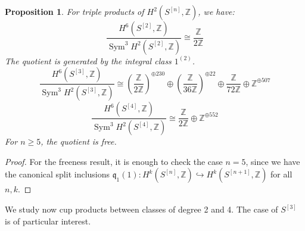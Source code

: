 \documentclass{amsart}
\DeclareMathOperator{\Sym}{Sym}
\newcommand{\hilb}[1]{^{[#1]}}
\newcommand{\One}{1}
\newcommand{\IZ}{\mathbb{Z}}
\newcommand{\kq}{\mathfrak{q}}
\theoremstyle{plain}
\newtheorem{proposition}[theorem]{Proposition}
\theoremstyle{definition}
\theoremstyle{remark}
\begin{document}
\begin{proposition} For triple products of $H^2(S\hilb{n},\IZ)$, we have:
$$
\frac{H^6(S\hilb{2},\IZ)}{\Sym^3 H^2(S\hilb{2},\IZ)} \cong 
\frac{\IZ}{2\IZ}
$$
The quotient is generated by the integral class $\One^{(2)}$.
$$
\frac{H^6(S\hilb{3},\IZ)}{\Sym^3 H^2(S\hilb{3},\IZ)} \cong  \left(\frac{\IZ}{2\IZ}\right)^{\oplus 230}\oplus \left(\frac{\IZ}{36\IZ}\right)^{\oplus 22}\oplus \frac{\IZ}{72\IZ} \oplus \IZ^{\oplus 507}
$$
$$
\frac{H^6(S\hilb{4},\IZ)}{\Sym^3 H^2(S\hilb{4},\IZ)} \cong  \frac{\IZ}{2\IZ} \oplus \IZ^{\oplus 552}
$$
For $n\geq 5$, the quotient is free.
\end{proposition}
\begin{proof}
For the freeness result, it is enough to check the case $n=5$, since we have the canonical split inclusions $\kq_1(1) : H^k(S\hilb{n},\IZ)\hookrightarrow H^k(S\hilb{n+1},\IZ)$ for all $n,k$.
\end{proof}
We study now cup products between classes of degree 2 and 4. The case of $S\hilb{3}$ is of particular interest.
\end{document}

